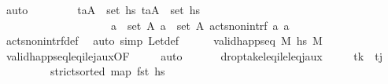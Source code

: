 \begin{isabellebody}
\ auto\isanewline
\ \ \ \ \isamarkupfalse%
\ \isamarkupfalse%
\ {}{\isacharcolon}{\kern0pt}\ {\isachardoublequoteopen}{\isasymforall}{\isacharparenleft}{\kern0pt}t\isactrlsub a{\isacharcomma}{\kern0pt}A{\isacharparenright}{\kern0pt}\ {\isasymin}\ set\ {\isacharquery}{\kern0pt}hs{\isacharprime}{\kern0pt}{\isachardot}{\kern0pt}\ {\isasymforall}{\isacharparenleft}{\kern0pt}t\isactrlsub a{\isacharprime}{\kern0pt}{\isacharcomma}{\kern0pt}A{\isacharprime}{\kern0pt}{\isacharparenright}{\kern0pt}\ {\isasymin}\ set\ {\isacharquery}{\kern0pt}hs{\isacharprime}{\kern0pt}{\isachardot}{\kern0pt}\ \isanewline
\ \ \ \ \ \ \ \ \ \ \ \ \ \ \ \ \ \ \ \ {\isasymforall}a\ {\isasymin}\ set\ A{\isachardot}{\kern0pt}\ {\isasymforall}a{\isacharprime}{\kern0pt}\ {\isasymin}\ set\ A{\isacharprime}{\kern0pt}{\isachardot}{\kern0pt}\ acts{\isacharunderscore}{\kern0pt}non{\isacharunderscore}{\kern0pt}intrf\ a\ a{\isacharprime}{\kern0pt}{\isachardoublequoteclose}\isanewline
\ \ \ \ \ \ \isamarkupfalse%
\ acts{\isacharunderscore}{\kern0pt}non{\isacharunderscore}{\kern0pt}intrf{\isacharunderscore}{\kern0pt}def\ \isamarkupfalse%
\ {\isacharparenleft}{\kern0pt}auto\ simp{\isacharcolon}{\kern0pt}\ Let{\isacharunderscore}{\kern0pt}def{\isacharparenright}{\kern0pt}\isanewline
\ \ \ \ \isamarkupfalse%
\ {\isachardoublequoteopen}valid{\isacharunderscore}{\kern0pt}happ{\isacharunderscore}{\kern0pt}seq\ M\ {\isacharquery}{\kern0pt}hs{\isacharprime}{\kern0pt}\ M{\isachardoublequoteclose}\isanewline
\ \ \ \ \ \ \isamarkupfalse%
\ valid{\isacharunderscore}{\kern0pt}happ{\isacharunderscore}{\kern0pt}seq{\isacharunderscore}{\kern0pt}leq\isactrlsub i{\isacharunderscore}{\kern0pt}le\isactrlsub j{\isacharunderscore}{\kern0pt}aux{}{\isacharbrackleft}{\kern0pt}OF\ {}\ {}\ {}{\isacharbrackright}{\kern0pt}\ \isamarkupfalse%
\ auto\isanewline
\ \ \isamarkupfalse%
%
\endisatagproof
{\isafoldproof}%
%
\isadelimproof
\isanewline
%
\endisadelimproof
\isanewline
\ \ \isamarkupfalse%
\ drop{\isacharunderscore}{\kern0pt}take{\isacharunderscore}{\kern0pt}leq\isactrlsub i{\isacharunderscore}{\kern0pt}le{\isacharunderscore}{\kern0pt}leq\isactrlsub j{\isacharunderscore}{\kern0pt}aux{\isacharcolon}{\kern0pt}\isanewline
\ \ \ \ \ {\isachardoublequoteopen}t\isactrlsub k\ {\isasymle}\ t\isactrlsub j{\isachardoublequoteclose}\isanewline
\ \ \ \ \ \ \ \ \ {\isachardoublequoteopen}strict{\isacharunderscore}{\kern0pt}sorted\ {\isacharparenleft}{\kern0pt}map\ fst\ hs{\isacharparenright}{\kern0pt}{\isachardoublequoteclose}\isanewline

\end{isabellebody}
